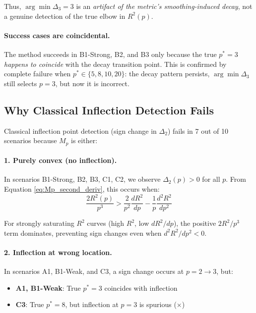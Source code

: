 \documentclass[11pt,a4paper]{article}
\begin{document}
Thus, $\arg\min \Delta_3 = 3$ is an \emph{artifact of the metric's smoothing-induced decay}, not a genuine detection of the true elbow in $R^2(p)$.

\paragraph{Success cases are coincidental.}
The method succeeds in B1-Strong, B2, and B3 only because the true $p^* = 3$ \emph{happens to coincide} with the decay transition point. This is confirmed by complete failure when $p^* \in \{5, 8, 10, 20\}$: the decay pattern persists, $\arg\min \Delta_3$ still selects $p = 3$, but now it is incorrect.

\subsection{Why Classical Inflection Detection Fails}

Classical inflection point detection (sign change in $\Delta_2$) fails in 7 out of 10 scenarios because $M_p$ is either:

\paragraph{1. Purely convex (no inflection).}
In scenarios B1-Strong, B2, B3, C1, C2, we observe $\Delta_2(p) > 0$ for all $p$. From Equation \eqref{eq:Mp_second_deriv}, this occurs when:
\begin{equation}
\frac{2R^2(p)}{p^3} > \frac{2}{p^2}\frac{dR^2}{dp} - \frac{1}{p}\frac{d^2R^2}{dp^2}
\end{equation}

For strongly saturating $R^2$ curves (high $R^2$, low $dR^2/dp$), the positive $2R^2/p^3$ term dominates, preventing sign changes even when $d^2R^2/dp^2 < 0$.

\paragraph{2. Inflection at wrong location.}
In scenarios A1, B1-Weak, and C3, a sign change occurs at $p = 2 \to 3$, but:
\begin{itemize}
\item \textbf{A1, B1-Weak}: True $p^* = 3$ coincides with inflection \checkmark
\item \textbf{C3}: True $p^* = 8$, but inflection at $p = 3$ is spurious ($\times$)
\end{itemize}
\end{document}
